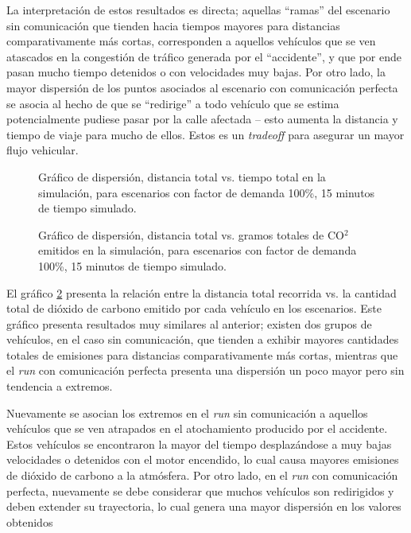 La interpretación de estos resultados es directa; aquellas ``ramas'' del escenario sin comunicación que tienden hacia tiempos mayores para distancias comparativamente más cortas, corresponden a aquellos vehículos que se ven atascados en la congestión de tráfico generada por el ``accidente'', y que por ende pasan mucho tiempo detenidos o con velocidades muy bajas. Por otro lado, la mayor dispersión de los puntos asociados al escenario con comunicación perfecta se asocia al hecho de que se ``redirige'' a todo vehículo que se estima potencialmente pudiese pasar por la calle afectada -- esto aumenta la distancia y tiempo de viaje para mucho de ellos. Estos es un \emph{tradeoff} para asegurar un mayor flujo vehicular.

\begin{figure}[tpb]
    \centering
    
    \caption[Distancia vs. tiempo total]{Gráfico de dispersión, distancia total vs. tiempo total en la simulación, para escenarios con factor de demanda 100\%, 15 minutos de tiempo simulado.}
    \label{fig:distvstime}
\end{figure}

\begin{figure}[tpb]
    \centering
    
    \caption[Distancia vs. CO$^{2}$ total]{Gráfico de dispersión, distancia total vs. gramos totales de CO$^{2}$ emitidos en la simulación, para escenarios con factor de demanda 100\%, 15 minutos de tiempo simulado.}
    \label{fig:distvsco2}
\end{figure}

El gráfico \ref{fig:distvsco2} presenta la relación entre la distancia total recorrida vs. la cantidad total de dióxido de carbono emitido por cada vehículo en los escenarios. Este gráfico presenta resultados muy similares al anterior; existen dos grupos de vehículos, en el caso sin comunicación, que tienden a exhibir mayores cantidades totales de emisiones para distancias comparativamente más cortas, mientras que el \emph{run} con comunicación perfecta presenta una dispersión un poco mayor pero sin tendencia a extremos.

Nuevamente se asocian los extremos en el \emph{run} sin comunicación a aquellos vehículos que se ven atrapados en el atochamiento producido por el accidente. Estos vehículos se encontraron la mayor del tiempo desplazándose a muy bajas velocidades o detenidos con el motor encendido, lo cual causa mayores emisiones de dióxido de carbono a la atmósfera. Por otro lado, en el \emph{run} con comunicación perfecta, nuevamente se debe considerar que muchos vehículos son redirigidos y deben extender su trayectoria, lo cual genera una mayor dispersión en los valores obtenidos

